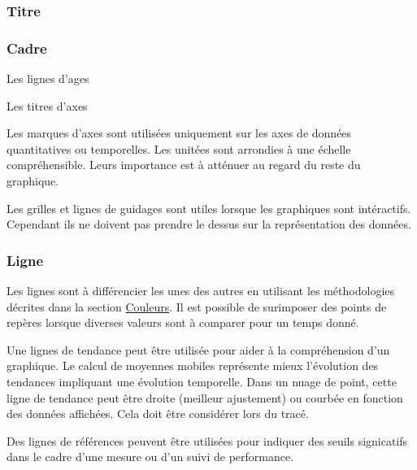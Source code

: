\documentclass[a4paper,12pt]{article}
\begin{document}
\begin{multicols}{2}
\subsubsection*{Titre}
\label{sec:orgc83c0b9}
\subsubsection*{Cadre}
\label{sec:org1720fca}
Les lignes d'ages

Les titres d'axes

Les marques d'axes sont utilisées uniquement sur les axes de données quantitatives ou temporelles. Les unitées sont arrondies à une échelle compréhensible. Leurs importance est à atténuer au regard du reste du graphique. \autocite{stephenfewComponentlevelGraphDesign2012}

Les grilles et lignes de guidages sont utiles lorsque les graphiques sont intéractifs. Cependant ils ne doivent pas prendre le dessus sur la représentation des données. \autocite{dougschepersDesigningDataCognitive2022}
\subsubsection*{Ligne}
\label{sec:orgd9b7a35}
Les lignes sont à différencier les unes des autres en utilisant les méthodologies décrites dans la section \hyperref[sec:org21e461d]{Couleurs}. Il est possible de surimposer des points de repères lorsque diverses valeurs sont à comparer pour un temps donné. \autocite{stephenfewComponentlevelGraphDesign2012}

Une lignes de tendance peut être utilisée pour aider à la compréhension d'un graphique. Le calcul de moyennes mobiles représente mieux l'évolution des tendances impliquant une évolution temporelle. Dans un nuage de point, cette ligne de tendance peut être droite (meilleur ajustement) ou courbée en fonction des données affichées. Cela doit être considérer lors du tracé. \autocite{stephenfewComponentlevelGraphDesign2012}

Des lignes de références peuvent être utilisées pour indiquer des seuils signicatifs dans le cadre d'une mesure ou d'un suivi de performance. \autocite{stephenfewComponentlevelGraphDesign2012}

\end{multicols}
\end{document}
